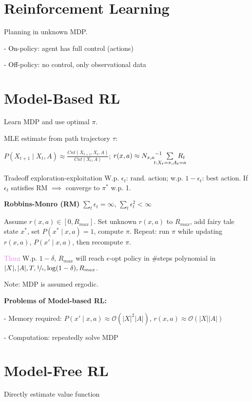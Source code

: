 \vspace*{1mm}
\section{Reinforcement Learning} 
Planning in unknown MDP.

- \textcolor{black}{On}-policy: agent has full control (actions)

- \textcolor{black}{Off}-policy: no control, only observational data 

\section{Model-Based RL}
{Learn MDP and use optimal $\pi$.}

MLE estimate from path trajectory $\tau$:

{\fontsize{8.8}{6}\selectfont $P(X_{t+1} \mid X_t, A) \approx \frac{Cnt(X_{t+1}, X_t, A)}{Cnt(X_t, A)}$;
$r(x,a) \approx {N_{x,a}}^{-1} \hspace*{-5mm} \sum\limits_{t: X_t = x, A_t = a} \hspace*{-5mm} R_t$}

 Tradeoff exploration-exploitation
W.p. $\epsilon_t$: rand. action; w.p. $1 - \epsilon_t$: best action.
If $\epsilon_t$ satisfies RM $\implies$ converge to $\pi^*$ w.p. 1.

\textbf{Robbins-Monro (RM)} 
{\fontsize{10}{6}\selectfont$\sum_t \epsilon_t = \infty$, $\sum_t \epsilon_t^2 < \infty$}

Assume $r(x,a) \in[0, R_{max}]$. Set unknown $r(x,a)$ to $R_{max}$, 
add {fairy tale state $x^*$}, set $P(x^* \mid x,a) = 1$, compute $\pi$. Repeat: run $\pi$ while updating $r(x,a)$, $P(x' \mid x,a)$, then recompute $\pi$.

\textcolor{violet}{Thm}: W.p. $1 - \delta$, $R_{max}$
will reach $\epsilon$-opt policy in \#steps polynomial in $|X|, |A|, T, \nicefrac{1}{\epsilon}, \log(1 - \delta), R_{max}$.

Note: MDP is assumed ergodic.

\textbf{Problems of Model-based RL:}

 - Memory required: $P(x'\mid x,a) \approx \mathcal{O}(|X|^2 |A|)$, $r(x,a) \approx \mathcal{O}(|X||A|)$

- Computation: repeatedly solve MDP


\section{Model-Free RL} 
{Directly estimate value function}

